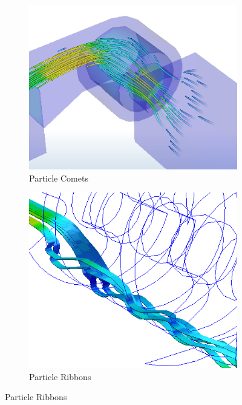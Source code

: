 \begin{figure}
    \centering
    \begin{subfigure}{0.45\textwidth}%
        \includegraphics[width=\linewidth]{Ch20Research/figures/autodesk_particle_comets.png}%
        \caption{Particle Comets}%
    \end{subfigure}%
    \begin{subfigure}{0.45\textwidth}%
        \includegraphics[width=\linewidth]{Ch20Research/figures/autodesk_particle_ribbons.png}%
        \caption{Particle Ribbons}%
    \end{subfigure}
    

\end{figure}
